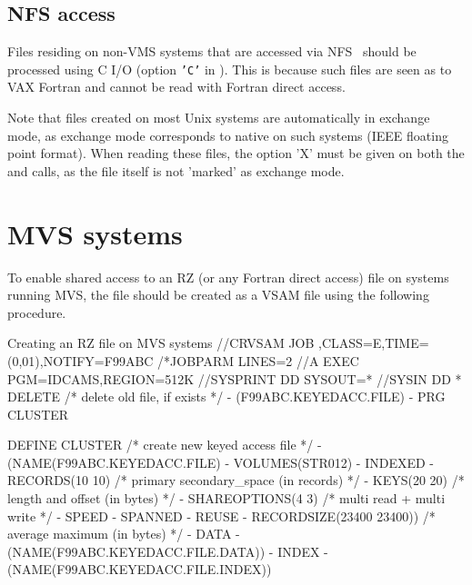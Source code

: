 \subsection{NFS access}

Files residing on non-VMS systems that are accessed via NFS~\cite{bib-NFS}
should be processed using C I/O (option {\tt'C'} in ).
This is because such files are seen as  to VAX Fortran
and cannot be read with Fortran direct access.

Note that files created on most Unix systems are automatically
in exchange mode, as exchange mode corresponds to native on
such systems (IEEE floating point format). When reading these
files, the option 'X' must be given on both the 
and  calls, as the file itself is not 'marked'
as exchange mode.

\newpage
{}
\section{MVS systems}

To enable shared access to an RZ (or any Fortran direct access) file
on systems running MVS, the file should be created as a VSAM
file using the following procedure.

\begin{XMPt}{Creating an RZ file on MVS systems}
         //CRVSAM    JOB  ,CLASS=E,TIME=(0,01),NOTIFY=F99ABC
         /*JOBPARM LINES=2
         //A EXEC PGM=IDCAMS,REGION=512K
         //SYSPRINT DD SYSOUT=*
         //SYSIN DD *
          DELETE                  /* delete old file, if exists */ -
          (F99ABC.KEYEDACC.FILE) -
          PRG    CLUSTER
 
          DEFINE CLUSTER          /* create new keyed access file */ -
          (NAME(F99ABC.KEYEDACC.FILE) -
          VOLUMES(STR012) -
          INDEXED -
          RECORDS(10 10)          /* primary secondary_space (in records) */ -
          KEYS(20 20)             /* length and offset (in bytes) */ -
           SHAREOPTIONS(4 3)       /* multi read + multi write */ -
          SPEED -
          SPANNED -
          REUSE -
          RECORDSIZE(23400 23400))      /* average maximum (in bytes) */ -
          DATA -
          (NAME(F99ABC.KEYEDACC.FILE.DATA)) -
          INDEX -
          (NAME(F99ABC.KEYEDACC.FILE.INDEX))
\end{XMPt}

